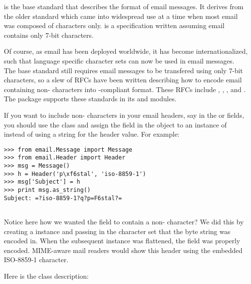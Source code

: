
 is the base standard that describes the format of email
messages.  It derives from the older  standard which came
into widespread use at a time when most email was composed of \ASCII{}
characters only.   is a specification written assuming email
contains only 7-bit \ASCII{} characters.

Of course, as email has been deployed worldwide, it has become
internationalized, such that language specific character sets can now
be used in email messages.  The base standard still requires email
messages to be transfered using only 7-bit \ASCII{} characters, so a
slew of RFCs have been written describing how to encode email
containing non-\ASCII{} characters into -compliant format.
These RFCs include , , , and .
The  package supports these standards in its
 and  modules.

If you want to include non-\ASCII{} characters in your email headers,
say in the  or  fields, you should
use the  class and assign the field in the
 object to an instance of  instead of
using a string for the header value.  For example:

\begin{verbatim}
>>> from email.Message import Message
>>> from email.Header import Header
>>> msg = Message()
>>> h = Header('p\xf6stal', 'iso-8859-1')
>>> msg['Subject'] = h
>>> print msg.as_string()
Subject: =?iso-8859-1?q?p=F6stal?=


\end{verbatim}

Notice here how we wanted the  field to contain a
non-\ASCII{} character?  We did this by creating a 
instance and passing in the character set that the byte string was
encoded in.  When the subsequent  instance was
flattened, the  field was properly 
encoded.  MIME-aware mail readers would show this header using the
embedded ISO-8859-1 character.


Here is the  class description:

